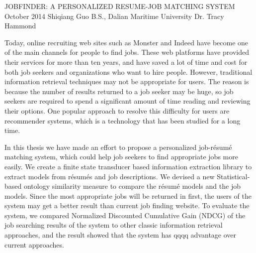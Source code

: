 \begingroup
\absone
{JOBFINDER: A PERSONALIZED RESUME-JOB MATCHING SYSTEM}
{October 2014}
{Shiqiang Guo}
{B.S., Dalian Maritime University}  %
{Dr. Tracy Hammond}%
{
Today, online recruiting web sites such as Monster and Indeed have become one of the main channels for people to find jobs. These web platforms have provided their services for more than ten years, and have saved a lot of time and cost for both job seekers and organizations who want to hire people. However, traditional information retrieval techniques may not be appropriate for users. The reason is because the number of results returned to a job seeker may be huge, so job seekers are required to spend a significant amount of time reading and reviewing their options. One popular approach to resolve this difficulty for users are recommender systems, which is a technology that has been studied for a long time.

In this thesis we have made an effort to propose a personalized job-r\'esum\'e matching system, which could help job seekers to find appropriate jobs more easily.  We create a finite state transducer based information extraction library to extract models from r\'esum\'es and job descriptions. We devised a new Statistical-based ontology similarity measure to compare the r\'esum\'e models and the job models. Since the most appropriate jobs will be returned in first, the users of the system may get a better result than current job finding website. To evaluate the system, we compared Normalized Discounted Cumulative Gain (NDCG) of the job searching results of the system to other classic information retrieval approaches, and the result showed that the system has  qqqq advantage over current approaches.}
\endgroup



